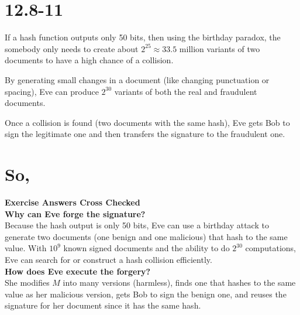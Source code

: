 \documentclass[12pt]{article}
\begin{document}
\section*{12.8-11}


If a hash function outputs only 50 bits, then using the birthday paradox, the somebody only needs to create about \( 2^{25} \approx 33.5 \) million variants of two documents to have a high chance of a collision.

By generating small changes in a document (like changing punctuation or spacing), Eve can produce \( 2^{30} \) variants of both the real and fraudulent documents.

Once a collision is found (two documents with the same hash), Eve gets Bob to sign the legitimate one and then transfers the signature to the fraudulent one.
\section*{So,}
\textbf{Exercise Answers Cross Checked} \\
\textbf{Why can Eve forge the signature?} \\
Because the hash output is only 50 bits, Eve can use a birthday attack to generate two documents (one benign and one malicious) that hash to the same value. With \( 10^9 \) known signed documents and the ability to do \( 2^{30} \) computations, Eve can search for or construct a hash collision efficiently.\\

\textbf{How does Eve execute the forgery?} \\
She modifies \( M \) into many versions (harmless), finds one that hashes to the same value as her malicious version, gets Bob to sign the benign one, and reuses the signature for her document since it has the same hash.
\end{document}
